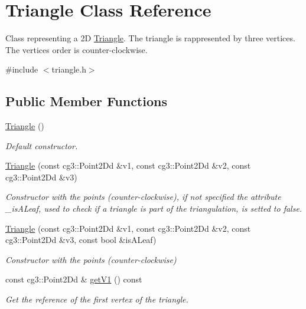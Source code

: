 \hypertarget{classTriangle}{}\section{Triangle Class Reference}
\label{classTriangle}


Class representing a 2D \hyperlink{classTriangle}{Triangle}. The triangle is rappresented by three vertices. The vertices order is counter-\/clockwise.  




{\ttfamily \#include $<$triangle.\+h$>$}

\subsection*{Public Member Functions}
\begin{DoxyCompactItemize}
\item 
\mbox{\label{classTriangle_aaefe4ed500c07918d30c6f0e286332c5}} 
\hyperlink{classTriangle_aaefe4ed500c07918d30c6f0e286332c5}{Triangle} ()
\begin{DoxyCompactList}\small\item\em Default constructor. \end{DoxyCompactList}\item 
\hyperlink{classTriangle_a3bb081f3c4d90284e27e1005a2b33599}{Triangle} (const cg3\+::\+Point2\+Dd \&v1, const cg3\+::\+Point2\+Dd \&v2, const cg3\+::\+Point2\+Dd \&v3)
\begin{DoxyCompactList}\small\item\em Constructor with the points (counter-\/clockwise), if not specified the attribute \+\_\+is\+A\+Leaf, used to check if a triangle is part of the triangulation, is setted to false. \end{DoxyCompactList}\item 
\hyperlink{classTriangle_a117fd4a79f805e6cfa5af2ea9067da88}{Triangle} (const cg3\+::\+Point2\+Dd \&v1, const cg3\+::\+Point2\+Dd \&v2, const cg3\+::\+Point2\+Dd \&v3, const bool \&is\+A\+Leaf)
\begin{DoxyCompactList}\small\item\em Constructor with the points (counter-\/clockwise) \end{DoxyCompactList}\item 
const cg3\+::\+Point2\+Dd \& \hyperlink{classTriangle_a70da71528307c6b80cf0334f1ccd13a0}{get\+V1} () const
\begin{DoxyCompactList}\small\item\em Get the reference of the first vertex of the triangle. \end{DoxyCompactList}\item 

\end{DoxyCompactItemize}
